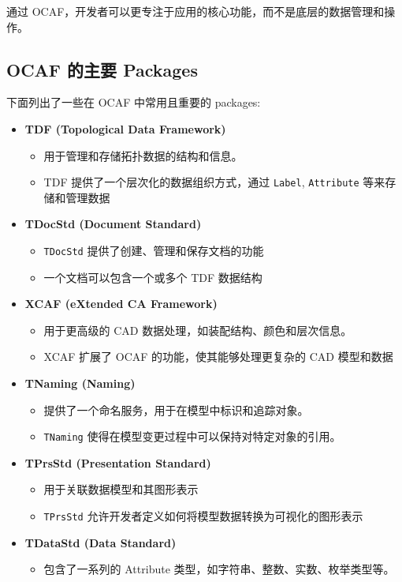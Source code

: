 \documentclass[11pt]{article}
\begin{document}
通过 OCAF，开发者可以更专注于应用的核心功能，而不是底层的数据管理和操作。
\subsection{OCAF 的主要 Packages}
\label{sec:org4ce0a77}

下面列出了一些在 OCAF 中常用且重要的 packages:

\begin{itemize}
\item \textbf{TDF (Topological Data Framework)}
\begin{itemize}
\item 用于管理和存储拓扑数据的结构和信息。
\item TDF 提供了一个层次化的数据组织方式，通过 \texttt{Label}, \texttt{Attribute} 等来存储和管理数据
\end{itemize}
\item \textbf{TDocStd (Document Standard)}
\begin{itemize}
\item \texttt{TDocStd} 提供了创建、管理和保存文档的功能
\item 一个文档可以包含一个或多个 TDF 数据结构
\end{itemize}
\item \textbf{XCAF (eXtended CA Framework)}
\begin{itemize}
\item 用于更高级的 CAD 数据处理，如装配结构、颜色和层次信息。
\item XCAF 扩展了 OCAF 的功能，使其能够处理更复杂的 CAD 模型和数据
\end{itemize}
\item \textbf{TNaming (Naming)}
\begin{itemize}
\item 提供了一个命名服务，用于在模型中标识和追踪对象。
\item \texttt{TNaming} 使得在模型变更过程中可以保持对特定对象的引用。
\end{itemize}
\item \textbf{TPrsStd (Presentation Standard)}
\begin{itemize}
\item 用于关联数据模型和其图形表示
\item \texttt{TPrsStd} 允许开发者定义如何将模型数据转换为可视化的图形表示
\end{itemize}
\item \textbf{TDataStd (Data Standard)}
\begin{itemize}
\item 包含了一系列的 Attribute 类型，如字符串、整数、实数、枚举类型等。

\end{itemize}
\end{itemize}
\end{document}
